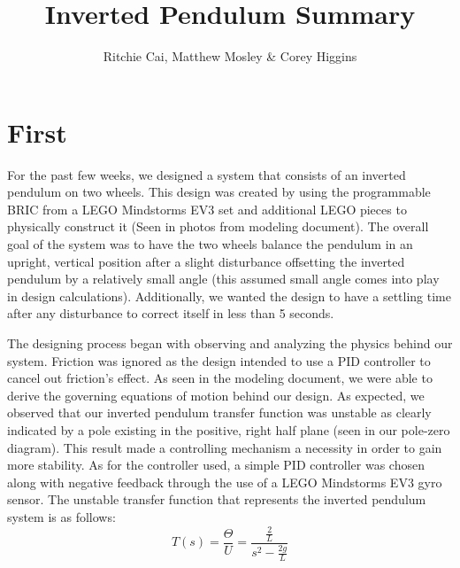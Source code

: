 \documentclass{notes}
\author{Ritchie Cai, Matthew Mosley \& Corey Higgins}
\title{Inverted Pendulum Summary}
\begin{document}
\maketitle 
\section{First}
For the past few weeks, we designed a system that consists of an inverted pendulum on two wheels. This design was created by using the programmable BRIC from a LEGO Mindstorms EV3 set and additional LEGO pieces to physically construct it (Seen in photos from modeling document). The overall goal of the system was to have the two wheels balance the pendulum in an upright, vertical position after a slight disturbance offsetting the inverted pendulum by a relatively small angle (this assumed small angle comes into play in design calculations). Additionally, we wanted the design to have a settling time after any disturbance to correct itself in less than 5 seconds.
   
The designing process began with observing and analyzing the physics behind our system. Friction was ignored as the design intended to use a PID controller to cancel out friction's effect. As seen in the modeling document, we were able to derive the governing equations of motion behind our design. As expected, we observed that our inverted pendulum transfer function was unstable as clearly indicated by a pole existing in the positive, right half plane (seen in our pole-zero diagram). This result made a controlling mechanism a necessity in order to gain more stability. As for the controller used, a simple PID controller was chosen along with negative feedback through the use of a LEGO Mindstorms EV3 gyro sensor. The unstable transfer function that represents the inverted pendulum system is as follows:
\[
  T(s) = \dfrac{\Theta}{U} = \dfrac{\frac{2}{L}}{s^2-\frac{2g}{L}}
\]          
\end{document}
